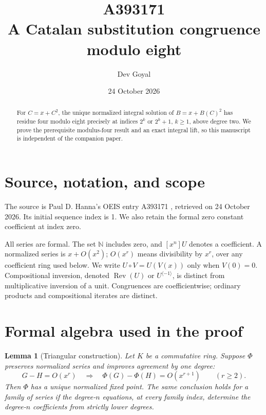 \documentclass[11pt,a4paper]{article}
\title{A393171\\[4pt]\large A Catalan substitution congruence modulo eight}
\author{Dev Goyal}
\date{24 October 2026}
\newtheorem{lemma}[theorem]{Lemma}
\theoremstyle{remark}
\newcommand{\N}{\mathbb N}
\newcommand{\Rev}{\operatorname{Rev}}
\newcommand{\rev}{^{\langle-1\rangle}}
\begin{document}
\maketitle
\begin{center}
\end{center}
\begin{abstract}
For $C=x+C^2$, the unique normalized integral solution of $B=x+B(C)^2$ has residue four modulo eight precisely at indices $2^k$ or $2^k+1$, $k\ge1$, above degree two. We prove the prerequisite modulus-four result and an exact integral lift, so this manuscript is independent of the companion paper.
\end{abstract}

\section{Source, notation, and scope}

The source is Paul D. Hanna's OEIS entry A393171 \cite{oeis171},
retrieved on 24 October 2026. Its initial sequence index is 1.
We also retain the formal zero constant coefficient at index zero.

All series are formal. The set $\N$ includes zero, and $[x^n]U$ denotes a
coefficient. A normalized series is $x+O(x^2)$; $O(x^r)$ means divisibility
by $x^r$, over any coefficient ring used below. We write $U\circ V=U(V(x))$
only when $V(0)=0$. Compositional inversion, denoted $\Rev(U)$ or $U\rev$,
is distinct from multiplicative inversion of a unit. Congruences are
coefficientwise; ordinary products and compositional iterates are distinct.

\section{Formal algebra used in the proof}

\begin{lemma}[Triangular construction]\label{lem:construction}
Let $K$ be a commutative ring. Suppose $\Phi$ preserves normalized series
and improves agreement by one degree:
\[
 G-H=O(x^r)\quad\Longrightarrow\quad
 \Phi(G)-\Phi(H)=O(x^{r+1})\qquad(r\ge2).
\]
Then $\Phi$ has a unique normalized fixed point. The same conclusion holds
for a family of series if the degree-$n$ equations, at every family index,
determine the degree-$n$ coefficients from strictly lower degrees.
\end{lemma}
\end{document}
